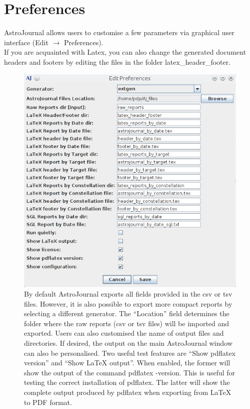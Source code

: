 \section{Preferences}
\label{sec:Preferences}
AstroJournal allows users to customise a few parameters via graphical user interface (Edit $\rightarrow$ Preferences).\\
If you are acquainted with Latex, you can also change the generated document headers and footers by editing the files in the folder latex\_header\_footer.

\begin{center}
\begin{figure}
\includegraphics[width=1.0\textwidth]{images/preferences}\par\vspace{1cm}
\caption[AstroJournal customisation]{By default AstroJournal exports all fields provided in the csv or tsv files. However, it is also possible to export more compact reports by selecting a different generator. The ``Location'' field determines the folder where the raw reports (csv or tsv files) will be imported and exported. Users can also customised the name of output files and directories. If desired, the output on the main AstroJournal window can also be personalised. Two useful test features are ``Show pdflatex version'' and ``Show LaTeX output''. When enabled, the former will show the output of the command pdflatex -version. This is useful for testing the correct installation of pdflatex. The latter will show the complete output produced by pdflatex when exporting from LaTeX to PDF format.}
\end{figure}
\end{center}
